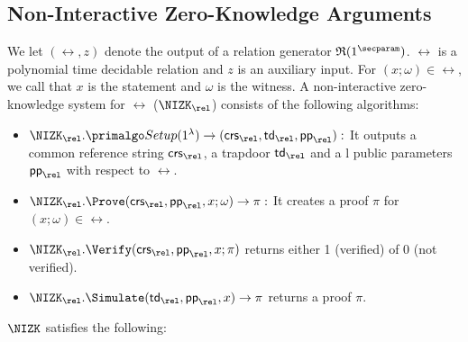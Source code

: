 %
%

\subsection{Non-Interactive Zero-Knowledge Arguments}

% 

We let $ (\rel, z) $ denote the output of a relation generator $ \mathfrak{R}(1^\secparam) $. $ \rel $ is a polynomial time decidable relation and $ z $ is an auxiliary input. For $ (x; \omega) \in \rel $, we call that $x$ is the statement and $ \omega $ is the witness.
A non-interactive zero-knowledge system for $\rel$ ($ \NIZK_\rel $)  consists of the following algorithms:
\begin{itemize}
	\item $\NIZK_\rel.\Setup(1^{\lambda}) \rightarrow (\crs_\rel, \tw_\rel, \pp_\rel):$  It  outputs a common reference string $ \crs_\rel $, a trapdoor $ \tw_\rel $ and a l public parameters $\pp_\rel$ with respect to $ \rel $. 
	\item $\NIZK_\rel.\Prove(\crs_\rel, \pp_\rel, x; \omega) \rightarrow \pi:$ It creates a proof $\pi$ for  $(x; \omega) \in \rel$. 
	\item $\NIZK_\rel.\Verify(\crs_\rel, \pp_\rel, x; \pi)$ returns either 1 (verified) of 0 (not verified).
	\item $ \NIZK_\rel.\Simulate(\tw_\rel, \pp_\rel, x) \rightarrow \pi$ returns a proof $ \pi $.
\end{itemize}	
$ \NIZK $ satisfies the following:

